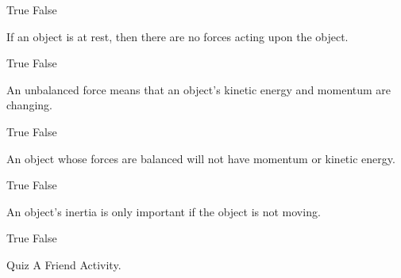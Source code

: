 \documentclass[../main-physics-problems.tex]{subfiles}
\begin{document}
\begin{questions}
\begin{randomizechoices}[norandomize]
    \choice True
    \correctchoice False
\end{randomizechoices}

\question
If an object is at rest, then there are no forces acting upon the object.

\begin{randomizechoices}[norandomize]
    \choice True
    \correctchoice False
\end{randomizechoices}

\question
An unbalanced force means that an object's kinetic energy and momentum are changing.

\begin{randomizechoices}[norandomize]
    \correctchoice True
    \choice False
\end{randomizechoices}

\question
An object whose forces are balanced will not have momentum or kinetic energy.

\begin{randomizechoices}[norandomize]
    \choice True
    \correctchoice False
\end{randomizechoices}

\question
An object's inertia is only important if the object is not moving.

\begin{randomizechoices}[norandomize]
    \choice True
    \correctchoice False
\end{randomizechoices}

\clearpage

 
    

\question
Quiz A Friend Activity.

%


\end{questions}
\end{document}
